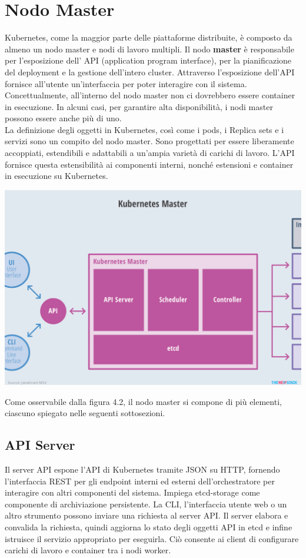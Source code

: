 \documentclass[12pt, a4paper]{report}
\begin{document}
\section{Nodo Master}
Kubernetes, come la maggior parte delle piattaforme distribuite, è composto da almeno un nodo master e nodi di lavoro multipli. Il nodo \textbf{master} è responsabile per l'esposizione dell' API (application program interface), per la pianificazione del deployment e la gestione dell'intero cluster. Attraverso l'esposizione dell'API fornisce all'utente un'interfaccia per poter interagire con il sistema. Concettualmente, all'interno del nodo master non ci dovrebbero essere container in esecuzione. In alcuni casi, per garantire alta disponibilità, i nodi master possono essere anche più di uno.
\\
La definizione degli oggetti in Kubernetes, così come i pods, i Replica sets e i servizi sono un compito del nodo master. Sono progettati per essere liberamente accoppiati, estendibili e adattabili a un'ampia varietà di carichi di lavoro. L'API fornisce questa estensibilità ai componenti interni, nonché estensioni e container in esecuzione su Kubernetes.
\begin{center}
  \includegraphics[scale=0.5]{Images/Kubernetes-master}
\end{center}
Come osservabile dalla figura 4.2, il nodo master si compone di più elementi, ciascuno spiegato nelle seguenti sottosezioni.
\subsection{API Server}
Il server API espone l'API di Kubernetes tramite JSON su HTTP, fornendo l'interfaccia REST per gli endpoint interni ed esterni dell'orchestratore per interagire con altri componenti del sistema. Impiega etcd-storage come componente di archiviazione persistente. La CLI, l'interfaccia utente web o un altro strumento possono inviare una richiesta al server API. Il server elabora e convalida la richiesta, quindi aggiorna lo stato degli oggetti API in etcd e infine istruisce il servizio appropriato per eseguirla. Ciò consente ai client di configurare carichi di lavoro e container tra i nodi worker.
\end{document}
